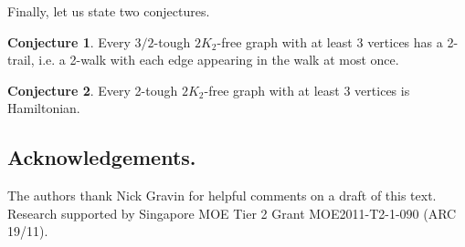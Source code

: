 \documentclass{amsart}
\theoremstyle{definition}
\newtheorem{conjecture}{Conjecture}
\begin{document}
Finally, let us state two conjectures.
\begin{conjecture}
Every $3/2$-tough $2K_2$-free graph with at least 3 vertices has a 2-trail, i.e. a 2-walk with each edge appearing in the walk at most once.
\end{conjecture}


\begin{conjecture}
Every 2-tough $2K_2$-free graph with at least 3 vertices is Hamiltonian.
\end{conjecture}

\subsection*{Acknowledgements.}
The authors thank Nick Gravin
for helpful comments on a draft of this text.
Research supported by Singapore MOE Tier 2 Grant MOE2011-T2-1-090 (ARC 19/11). 



%
\end{document}
